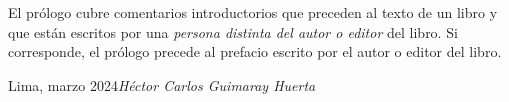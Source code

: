 %
%

\foreword

El prólogo cubre comentarios introductorios que preceden al texto de
un libro y que están escritos por una
\textit{persona distinta del autor o editor} del libro.
Si corresponde, el prólogo precede al prefacio escrito por el autor
o editor del libro.

\vspace{\baselineskip}
\begin{flushright}\noindent
    Lima, marzo 2024\hfill {\it Héctor Carlos Guimaray Huerta}
\end{flushright}
